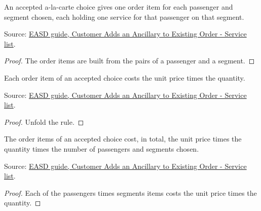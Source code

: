 \begin{theorem}
  \label{thm:ancillaries-alacarte-per-passenger-segment}
  An accepted a-la-carte choice gives one order item for each passenger and
  segment chosen, each holding one service for that passenger on that
  segment.

  Source: \href{https://standards.atlassian.net/wiki/spaces/EASD/pages/842301531}{EASD guide, Customer Adds an Ancillary to Existing Order - Service list}.
\end{theorem}
\begin{proof}
  The order items are built from the pairs of a passenger and a segment.
\end{proof}

\begin{theorem}
  \label{thm:ancillaries-alacarte-item-price}
  Each order item of an accepted choice costs the unit price times the
  quantity.

  Source: \href{https://standards.atlassian.net/wiki/spaces/EASD/pages/842301531}{EASD guide, Customer Adds an Ancillary to Existing Order - Service list}.
\end{theorem}
\begin{proof}
  Unfold the rule.
\end{proof}

\begin{theorem}
  \label{thm:ancillaries-alacarte-total}
  The order items of an accepted choice cost, in total, the unit price times
  the quantity times the number of passengers and segments chosen.

  Source: \href{https://standards.atlassian.net/wiki/spaces/EASD/pages/842301531}{EASD guide, Customer Adds an Ancillary to Existing Order - Service list}.
\end{theorem}
\begin{proof}
  Each of the passengers times segments items costs the unit price times
  the quantity.
\end{proof}

